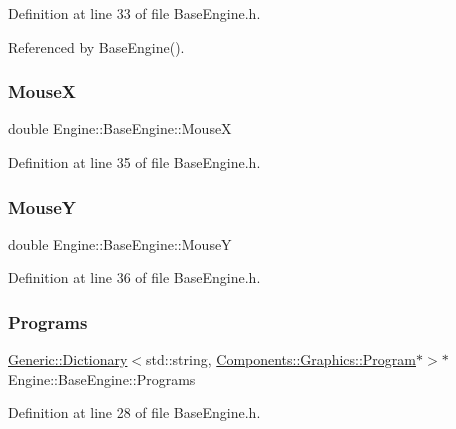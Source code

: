 Definition at line 33 of file Base\+Engine.\+h.



Referenced by Base\+Engine().

\mbox{\label{classEngine_1_1BaseEngine_a5fe085152ebe93346900407f6b41a034}} 
\subsubsection{\texorpdfstring{MouseX}{MouseX}}
{\footnotesize\ttfamily double Engine\+::\+Base\+Engine\+::\+MouseX}



Definition at line 35 of file Base\+Engine.\+h.

\mbox{\label{classEngine_1_1BaseEngine_a143c9c32dbbdc70bf1546ffe275bf384}} 
\subsubsection{\texorpdfstring{MouseY}{MouseY}}
{\footnotesize\ttfamily double Engine\+::\+Base\+Engine\+::\+MouseY}



Definition at line 36 of file Base\+Engine.\+h.

\mbox{\label{classEngine_1_1BaseEngine_ae0f86360ea3a384caefe443dd8f88601}} 
\subsubsection{\texorpdfstring{Programs}{Programs}}
{\footnotesize\ttfamily \mbox{\hyperlink{classGeneric_1_1Dictionary}{Generic\+::\+Dictionary}}$<$std\+::string, \mbox{\hyperlink{classEngine_1_1Components_1_1Graphics_1_1Program}{Components\+::\+Graphics\+::\+Program}}$\ast$$>$$\ast$ Engine\+::\+Base\+Engine\+::\+Programs}



Definition at line 28 of file Base\+Engine.\+h.



